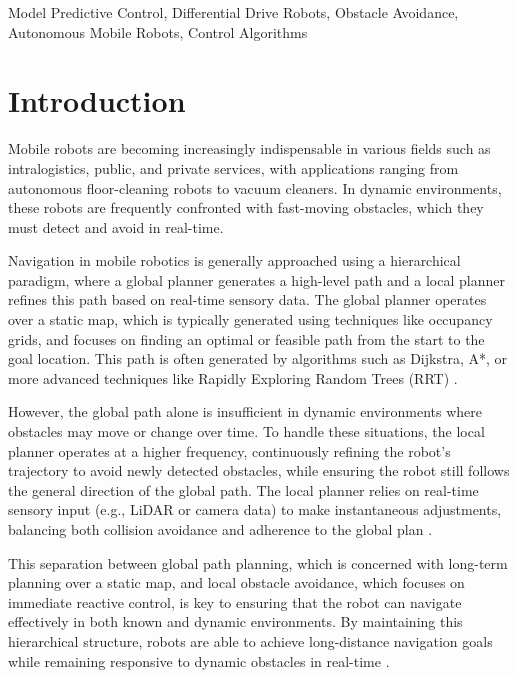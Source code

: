 \documentclass[conference]{IEEEtran}
\begin{document}
\begin{IEEEkeywords}
Model Predictive Control, Differential Drive Robots, Obstacle Avoidance, Autonomous Mobile Robots, Control Algorithms
\end{IEEEkeywords}

\section{Introduction}

Mobile robots are becoming increasingly indispensable in various fields such as intralogistics, public, and private services, with applications ranging from autonomous floor-cleaning robots to vacuum cleaners. In dynamic environments, these robots are frequently confronted with fast-moving obstacles, which they must detect and avoid in real-time. 

Navigation in mobile robotics is generally approached using a hierarchical paradigm, where a global planner generates a high-level path and a local planner refines this path based on real-time sensory data. The global planner operates over a static map, which is typically generated using techniques like occupancy grids, and focuses on finding an optimal or feasible path from the start to the goal location. This path is often generated by algorithms such as Dijkstra, A*, or more advanced techniques like Rapidly Exploring Random Trees (RRT) \cite{thrun2005probabilistic}.

However, the global path alone is insufficient in dynamic environments where obstacles may move or change over time. To handle these situations, the local planner operates at a higher frequency, continuously refining the robot's trajectory to avoid newly detected obstacles, while ensuring the robot still follows the general direction of the global path. The local planner relies on real-time sensory input (e.g., LiDAR or camera data) to make instantaneous adjustments, balancing both collision avoidance and adherence to the global plan \cite{khatib1986real, siegwart2011autonomous}.

This separation between global path planning, which is concerned with long-term planning over a static map, and local obstacle avoidance, which focuses on immediate reactive control, is key to ensuring that the robot can navigate effectively in both known and dynamic environments. By maintaining this hierarchical structure, robots are able to achieve long-distance navigation goals while remaining responsive to dynamic obstacles in real-time \cite{khatib1986real, siegwart2011autonomous}.
\end{document}
